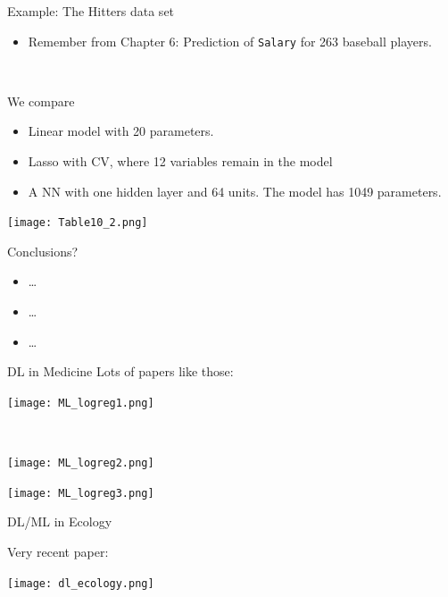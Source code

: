 \documentclass[
  10pt,
  ignorenonframetext,
]{beamer}
\providecommand{\tightlist}{%
  \setlength{\itemsep}{0pt}\setlength{\parskip}{0pt}}
\begin{document}
\begin{frame}[fragile]
\begin{block}{Example: The Hitters data set}
\protect\hypertarget{example-the-hitters-data-set}{}
\(~\)

\begin{itemize}
\tightlist
\item
  Remember from Chapter 6: Prediction of \texttt{Salary} for 263
  baseball players.
\end{itemize}

\(~\)

We compare

\vspace{2mm}

\begin{itemize}
\tightlist
\item
  Linear model with 20 parameters.
\item
  Lasso with CV, where 12 variables remain in the model
\item
  A NN with one hidden layer and 64 units. The model has 1049
  parameters.
\end{itemize}
\end{block}
\end{frame}

\begin{frame}
\texttt{[image: Table10\_2.png]} \(~\)

Conclusions?

\begin{itemize}
\tightlist
\item
  \ldots{}
\item
  \ldots{}
\item
  \ldots{}
\end{itemize}
\end{frame}

\begin{frame}
\begin{block}{DL in Medicine}
\protect\hypertarget{dl-in-medicine}{}
Lots of papers like those:

\centering

\texttt{[image: ML\_logreg1.png]}

\(~\)

\texttt{[image: ML\_logreg2.png]}

\texttt{[image: ML\_logreg3.png]}
\end{block}
\end{frame}

\begin{frame}
\begin{block}{DL/ML in Ecology}
\protect\hypertarget{dlml-in-ecology}{}
\(~\)

Very recent paper:

\texttt{[image: dl\_ecology.png]}
\end{block}
\end{frame}
\end{document}

